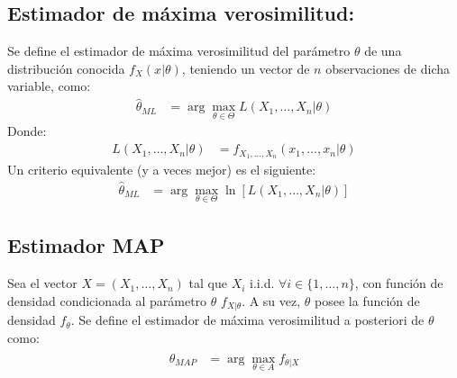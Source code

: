 \documentclass[
  11pt,
  letterpaper,
   addpoints,
  ]{exam}
\begin{document}
\subsection*{Estimador de máxima verosimilitud:}

Se define el estimador de máxima verosimilitud del parámetro $\theta$ de una distribución conocida $f_X(x|\theta)$, teniendo un vector de $n$ observaciones de dicha variable, como:
\begin{align}
\hat{\theta}_{ML} &= \arg \max_{\theta \in \Theta} L(X_1, \dots, X_n|\theta)
\end{align}
Donde:
\begin{align}
L(X_1, \dots, X_n|\theta) &= f_{X_1,\dots,X_n}(x_1, \dots, x_n|\theta)
\end{align}
Un criterio equivalente (y a veces mejor) es el siguiente:
\begin{align}
\hat{\theta}_{ML} &= \arg \max_{\theta \in \Theta} \ln[L(X_1, \dots, X_n|\theta)]
\end{align}

 
\subsection*{Estimador MAP}

Sea el vector $X = (X_1, \dots, X_n)$ tal que $X_i$ i.i.d. $\forall i \in \{1, \dots, n\}$, con función de densidad condicionada al parámetro $\theta$ $f_{X|\theta}$. A su vez, $\theta$ posee la función de densidad $f_\theta$. Se define el estimador de máxima verosimilitud a posteriori de $\theta$ como:
\begin{align}
\hat{\theta}_{MAP} &= \arg \max_{\theta \in A} f_{\theta|X}
\end{align}
\end{document}
